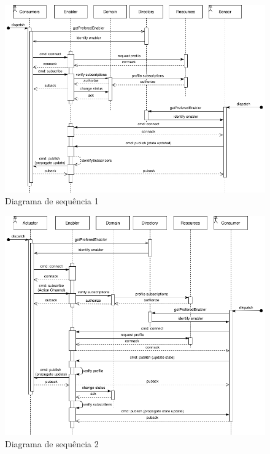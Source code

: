 \begin{figure}[tbh!]
	\centering
	\includegraphics[width=1.0\textwidth]{../images/sequence1}
	\caption{Diagrama de sequência 1}
	\label{fig:sequence1}
\end{figure}

\begin{figure}[tbh!]
	\centering
	\includegraphics[width=1.0\textwidth]{../images/sequence2}
	\caption{Diagrama de sequência 2}
	\label{fig:sequence2}
\end{figure}

